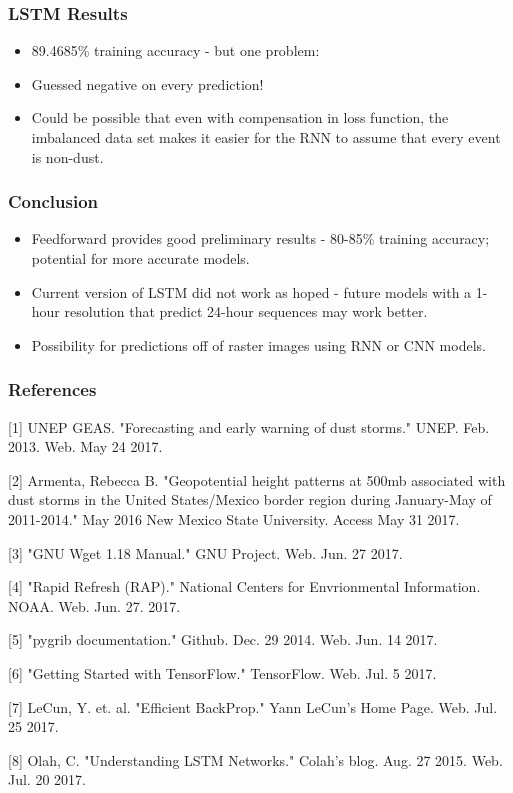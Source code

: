 \documentclass{beamer}
\begin{document}
\begin{frame}
	\frametitle{LSTM Results}
	\begin{itemize}
		\item 89.4685\% training accuracy - but one problem:
		\item Guessed negative on every prediction!
		\item Could be possible that even with compensation in loss function, the imbalanced data set makes it easier for the RNN to assume that every event is non-dust.
	\end{itemize}
\end{frame}
\begin{frame}
	\frametitle{Conclusion}
	\begin{itemize}
		\item
			Feedforward provides good preliminary results - 80-85\% training accuracy; potential for more accurate models.
		\item
			Current version of LSTM did not work as hoped - future models with a 1-hour resolution that predict 24-hour sequences may work better.
		\item
			Possibility for predictions off of raster images using RNN or CNN models.
	\end{itemize}
\end{frame}

\begin{frame}
	\frametitle{References}
	\small
	[1] UNEP GEAS. "Forecasting and early warning of dust storms." UNEP. Feb. 2013. Web. May 24 2017.

	[2] Armenta, Rebecca B. "Geopotential height patterns at 500mb associated with dust storms in the United States/Mexico border region during January-May of 2011-2014." May 2016 New Mexico State University.  Access May 31 2017.

	[3] "GNU Wget 1.18 Manual." GNU Project. Web. Jun. 27 2017.

	[4] "Rapid Refresh (RAP)." National Centers for Envrionmental Information. NOAA. Web. Jun. 27. 2017.

	[5] "pygrib documentation." Github. Dec. 29 2014. Web. Jun. 14 2017.

	[6] "Getting Started with TensorFlow." TensorFlow. Web. Jul. 5 2017.
	
	[7] LeCun, Y. et. al. "Efficient BackProp." Yann LeCun's Home Page. Web. Jul. 25 2017.

	[8] Olah, C. "Understanding LSTM Networks." Colah's blog. Aug. 27 2015. Web. Jul. 20 2017.

\end{frame}
\end{document}
